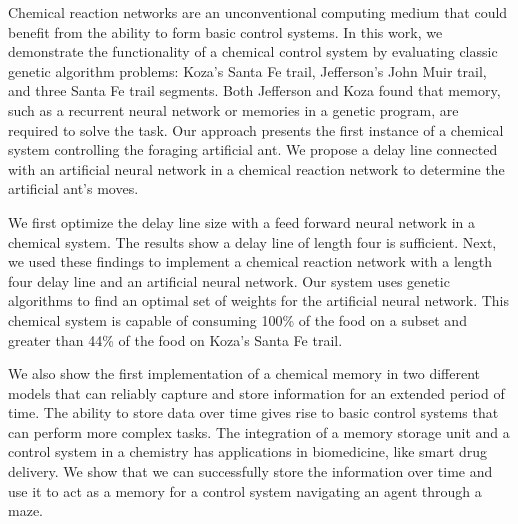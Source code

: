 Chemical reaction networks are an unconventional computing medium that could benefit from the ability to form basic control systems. In this work, we demonstrate the functionality of a chemical control system by evaluating classic genetic algorithm problems: Koza's Santa Fe trail, Jefferson's John Muir trail, and three Santa Fe trail segments. Both Jefferson and Koza found that memory, such as a recurrent neural network or memories in a genetic program, are required to solve the task. Our approach presents the first instance of a chemical system controlling the foraging artificial ant. We propose a delay line connected with an artificial neural network in a chemical reaction network to determine the artificial ant's moves. 

We first optimize the delay line size with a feed forward neural network in a chemical system. The results show a delay line of length four is sufficient. Next, we used these findings to implement a chemical reaction network with a length four delay line and an artificial neural network. Our system uses genetic algorithms to find an optimal set of weights for the artificial neural network. This chemical system is capable of consuming 100\% of the food on a subset and greater than 44\% of the food on Koza's Santa Fe trail.

We also show the first implementation of a chemical memory in two different models that can reliably capture and store information for an extended period of time. The ability to store data over time gives rise to basic control systems that can perform more complex tasks. The integration of a memory storage unit and a control system in a chemistry has applications in biomedicine, like smart drug delivery. We show that we can successfully store the information over time and use it to act as a memory for a control system navigating an agent through a maze. 